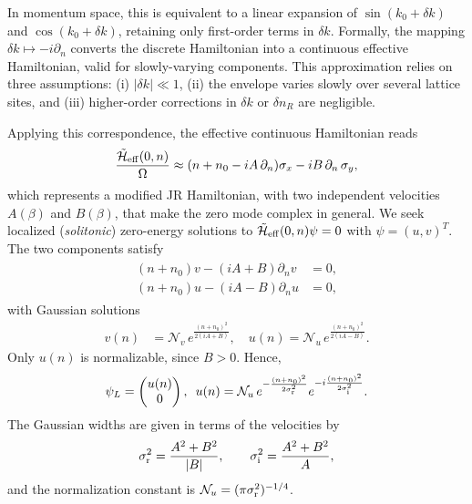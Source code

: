 \documentclass[a4paper,twocolumn,floatfix,10pt,superscriptaddress]%
{quantumarticle}
\newcommand{\mcl}[1]{\mathcal{#1}}
\begin{document}
In momentum space, this is equivalent to a linear expansion of $\sin(k_0+\delta k)$ and $\cos(k_0+\delta k)$, retaining only first-order terms in $\delta k$. Formally, the mapping $\delta k \mapsto -i\partial_n$ converts the discrete Hamiltonian into a continuous effective Hamiltonian, valid for slowly-varying components. This approximation relies on three assumptions: (i) $|\delta k|\ll 1$, (ii) the envelope varies slowly over several lattice sites, and (iii) higher-order corrections in $\delta k$ or $\delta n_R$ are negligible.

Applying this correspondence, the effective continuous Hamiltonian reads
\begin{align}
\frac{\tilde{\mcl{H}}_{\rm eff}(0,n)}{\Omega}\approx(n + n_0 -iA\,\partial_n)\sigma_x
-iB\,\partial_n\,\sigma_y,
\end{align}
which represents a modified JR Hamiltonian, with two independent velocities $A(\beta)$ and $B(\beta)$, that make the zero mode complex in general. We seek localized (\emph{solitonic}) zero-energy solutions to 
$\tilde{\mcl{H}}_{\rm eff}(0,n) \psi=0$ with $\psi=(u,v)^{\!T}$. The two components satisfy
\begin{align}\label{eq:u_v_right}
\begin{aligned}
(n+n_0) v-(iA+B)\partial_n v&=0,\\
(n+n_0) u-(iA-B)\partial_n u&=0,
\end{aligned}
\end{align}
with Gaussian solutions
\begin{align}
v(n)&=\mcl{N}_v\,e^{\frac{(n+n_0)^2}{2(iA+B)}},\quad
u(n)=\mcl{N}_u\,e^{\frac{(n+n_0)^2}{2(iA-B)}}.
\end{align}
Only $u(n)$ is normalizable, since $B > 0$. Hence,
\begin{align}
\begin{aligned}
\psi_L =
\begin{pmatrix} u(n) \\ 0 \end{pmatrix},
\,\,\,
u(n)=\mcl{N}_u \,e^{-\frac{(n+n_0)^2}{2\sigma_{\rm r}^2}}
      e^{-i\frac{(n + n_0)^2}{2\sigma_{\rm i}^2}}. %
\end{aligned}
\end{align}
The Gaussian widths are given in terms of the velocities by
\begin{equation}
\sigma_{\rm r}^2=\frac{A^2+B^2}{|B|}, \qquad
\sigma_{\rm i}^2=\frac{A^2+B^2}{A},
\end{equation}
and the normalization constant is $\mcl{N}_u=(\pi\sigma_{\rm r}^2)^{-1/4}$.
\end{document}
